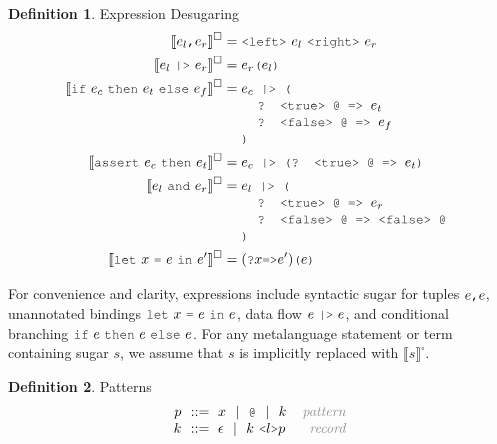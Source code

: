 \documentclass[acmsmall]{acmart}
\theoremstyle{definition}
\newtheorem{definition}{Definition}[section]
\begin{document}
\begin{definition} 
  \label{def:expression_desugaring}
  Expression Desugaring
  \hfill 
  \\
  \begin{align*}
      \llbracket e_l \J{,} e_r \rrbracket^\square &= \J{<left>}\ e_l \ \J{<right>}\ e_r
      \\
      \llbracket e_l\ \J{|>}\ e_r \rrbracket^\square &= e_r\J{(}e_l\J{)}
      \\
      \llbracket \J{if}\ e_c\ \J{then}\ e_t\ \J{else}\ e_f \rrbracket^\square &= 
      \begin{array}[t]{@{} l}
        e_c \J{ |> (}
          \\
          \I \J{? <true> @ => } e_t
          \\
          \I \J{? <false> @ => } e_f
          \\
        \J{)}
      \end{array}
      \\
      \llbracket \J{assert}\ e_c\ \J{then}\ e_t \rrbracket^\square &= 
      \begin{array}[t]{@{} l}
        e_c \J{ |> (? <true> @ => } e_t \J{)}
      \end{array}
      \\
      \llbracket e_l\ \J{and}\ e_r \rrbracket^\square &= 
      \begin{array}[t]{@{} l}
        e_l \J{ |> (}
          \\
          \I \J{? <true> @ => } e_r
          \\
          \I \J{? <false> @ => <false> @}
          \\
        \J{)}
      \end{array}
      \\
      \llbracket \J{let}\ x\ \J{=}\ e\ \J{in}\ e' \rrbracket^\square &= (\J{?}x \J{=>} e')\J{(}e\J{)}
  \end{align*}

\end{definition} 

\noindent
For convenience and clarity, expressions include syntactic sugar for tuples $e\J{,}e$, 
unannotated bindings $\J{let}\ x\ \J{=}\ e\ \J{in}\ e$, data flow $e\ \J{|>}\ e$,
and conditional branching $\J{if}\ e\ \J{then}\ e\ \J{else}\ e$.
For any metalanguage statement or term containing sugar $s$, we assume that $s$ is implicitly replaced with $\llbracket s \rrbracket^\square$.

\begin{definition} Patterns 
  \label{def:patterns}
  \[\begin{array}[t]{r@{}l@{}r}
    \nonterm{p} & \is 
      x \sep
      \J{@} \sep
      k
    & \com{pattern}
    \\
    \nonterm{k} & \is \epsilon \sep k\ \J{<}l\J{>}p
    & \com{record}
  \end{array}\]
\end{definition}
\end{document}
